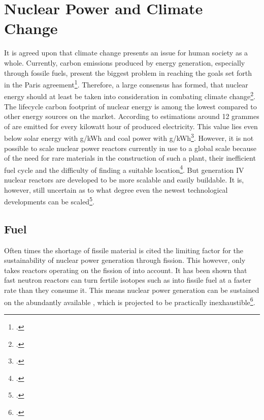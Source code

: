 \chapter{Nuclear Power and Climate Change}
It is agreed upon that climate change presents an issue for human society as a whole. Currently,
carbon emissions produced by energy generation, especially through fossile fuels,
present the biggest problem in reaching the goals set forth in the Paris agreement\footcite{paris}.
Therefore, a large consensus has formed, that nuclear energy should at least be taken into consideration
in combating climate change\footcite{nucandclim}.
The lifecycle carbon footprint of nuclear energy is among the lowest compared to other energy
sources on the market. According to estimations around 12 grammes of  are emitted for
every kilowatt hour of produced electricity. This value lies even below solar energy with \unit[40]{g/kWh}
and coal power with \unit[820]{g/kWh}\footcite{ipcc}. However, it is not possible to scale
nuclear power reactors currently in use to a global scale because of the need for rare materials
in the construction of such a plant, their inefficient fuel cycle and the difficulty of finding a
suitable location\footcite{scale}. But generation IV nuclear reactors are developed to be more
scalable and easily buildable. It is, however, still uncertain as to what degree even the newest
technological developments can be scaled\footcite{GIFAR}.
\section{Fuel}
Often times the shortage of fissile material is cited the limiting factor for the sustainability of
nuclear power generation through fission. This however, only takes reactors operating on the fission
of  into account. It has been shown that fast neutron reactors can turn fertile isotopes
such as  into fissile fuel at a faster rate than they consume it. This means nuclear
power generation can be sustained on the abundantly available , which is projected to
be practically inexhaustible\footcite{inex}.
